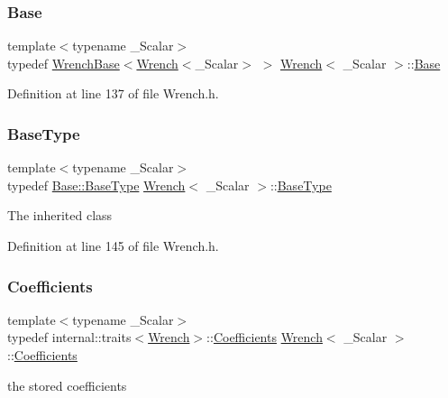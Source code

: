 \subsubsection{\texorpdfstring{Base}{Base}}
{\footnotesize\ttfamily template$<$typename \+\_\+\+Scalar$>$ \\
typedef \hyperlink{class_wrench_base}{Wrench\+Base}$<$\hyperlink{class_wrench}{Wrench}$<$\+\_\+\+Scalar$>$ $>$ \hyperlink{class_wrench}{Wrench}$<$ \+\_\+\+Scalar $>$\+::\hyperlink{class_wrench_a4f3f84e4c6510bc7c0613d9bcb784015}{Base}\hspace{0.3cm}{\ttfamily [protected]}}



Definition at line 137 of file Wrench.\+h.

\hypertarget{class_wrench_abc5de6653f57de3beb6335e474fc2802}{}\label{class_wrench_abc5de6653f57de3beb6335e474fc2802} 
\subsubsection{\texorpdfstring{Base\+Type}{BaseType}}
{\footnotesize\ttfamily template$<$typename \+\_\+\+Scalar$>$ \\
typedef \hyperlink{class_wrench_base_a8b98c467c6fb31bd7354dcbef134dca1}{Base\+::\+Base\+Type} \hyperlink{class_wrench}{Wrench}$<$ \+\_\+\+Scalar $>$\+::\hyperlink{class_wrench_abc5de6653f57de3beb6335e474fc2802}{Base\+Type}}

The inherited class 

Definition at line 145 of file Wrench.\+h.

\hypertarget{class_wrench_a3b7401ec055bd386fc3dc826308784e8}{}\label{class_wrench_a3b7401ec055bd386fc3dc826308784e8} 
\subsubsection{\texorpdfstring{Coefficients}{Coefficients}}
{\footnotesize\ttfamily template$<$typename \+\_\+\+Scalar$>$ \\
typedef internal\+::traits$<$\hyperlink{class_wrench}{Wrench}$>$\+::\hyperlink{class_wrench_a3b7401ec055bd386fc3dc826308784e8}{Coefficients} \hyperlink{class_wrench}{Wrench}$<$ \+\_\+\+Scalar $>$\+::\hyperlink{class_wrench_a3b7401ec055bd386fc3dc826308784e8}{Coefficients}}

the stored coefficients 

